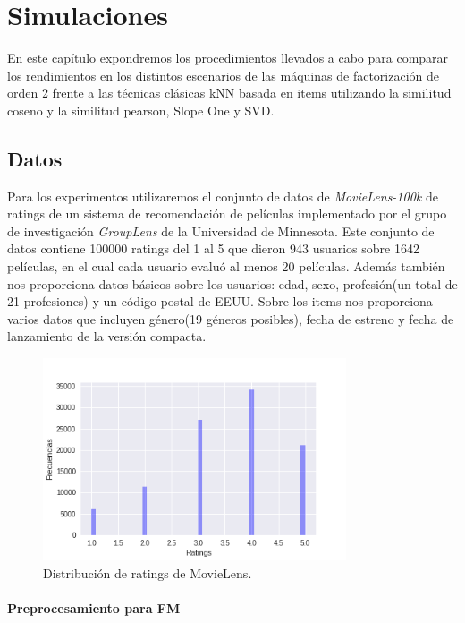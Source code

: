 \documentclass[hidelinks,12pt,a4paper]{book}
\theoremstyle{plain}
\theoremstyle{definition}
\begin{document}
\chapter{Simulaciones}

En este capítulo expondremos los procedimientos llevados a cabo para comparar los rendimientos en los distintos escenarios de las máquinas de factorización de orden 2 frente a las técnicas clásicas kNN basada en items utilizando la similitud coseno y la similitud pearson, Slope One y SVD.

\section{Datos}

Para los experimentos utilizaremos el conjunto de datos de \textit{MovieLens-100k}\cite{harper2016movielens} de ratings de un sistema de recomendación de películas implementado por el grupo de investigación \textit{GroupLens} de la Universidad de Minnesota. Este conjunto de datos contiene 100000 ratings del 1 al 5 que dieron 943 usuarios sobre 1642 películas, en el cual cada usuario evaluó al menos 20 películas. Además también nos proporciona datos básicos sobre los usuarios: edad, sexo, profesión(un total de 21 profesiones) y un código postal de EEUU. Sobre los items nos proporciona varios datos que incluyen género(19 géneros posibles), fecha de estreno y fecha de lanzamiento de la versión compacta.

\begin{figure}[!ht]
\centering
\includegraphics[width=0.8\textwidth]{graficos/frecratings.png}
\caption{Distribución de ratings de MovieLens.}\label{fig:frec-rat}
\end{figure}

\subsubsection{Preprocesamiento para FM}
\end{document}
